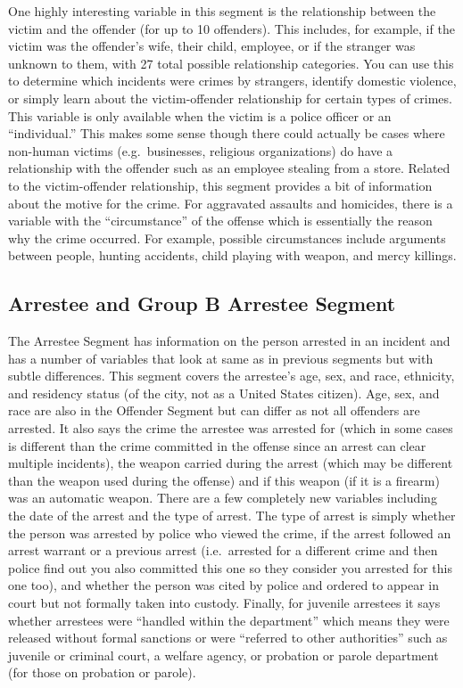 \documentclass[
  12pt,
  openany]{book}
\begin{document}
One highly interesting variable in this segment is the relationship between the victim and the offender (for up to 10 offenders). This includes, for example, if the victim was the offender's wife, their child, employee, or if the stranger was unknown to them, with 27 total possible relationship categories. You can use this to determine which incidents were crimes by strangers, identify domestic violence, or simply learn about the victim-offender relationship for certain types of crimes. This variable is only available when the victim is a police officer or an ``individual.'' This makes some sense though there could actually be cases where non-human victims (e.g.~businesses, religious organizations) do have a relationship with the offender such as an employee stealing from a store. Related to the victim-offender relationship, this segment provides a bit of information about the motive for the crime. For aggravated assaults and homicides, there is a variable with the ``circumstance'' of the offense which is essentially the reason why the crime occurred. For example, possible circumstances include arguments between people, hunting accidents, child playing with weapon, and mercy killings.

\subsection{Arrestee and Group B Arrestee Segment}\label{arrestee-and-group-b-arrestee-segment}

The Arrestee Segment has information on the person arrested in an incident and has a number of variables that look at same as in previous segments but with subtle differences. This segment covers the arrestee's age, sex, and race, ethnicity, and residency status (of the city, not as a United States citizen). Age, sex, and race are also in the Offender Segment but can differ as not all offenders are arrested. It also says the crime the arrestee was arrested for (which in some cases is different than the crime committed in the offense since an arrest can clear multiple incidents), the weapon carried during the arrest (which may be different than the weapon used during the offense) and if this weapon (if it is a firearm) was an automatic weapon. There are a few completely new variables including the date of the arrest and the type of arrest. The type of arrest is simply whether the person was arrested by police who viewed the crime, if the arrest followed an arrest warrant or a previous arrest (i.e.~arrested for a different crime and then police find out you also committed this one so they consider you arrested for this one too), and whether the person was cited by police and ordered to appear in court but not formally taken into custody. Finally, for juvenile arrestees it says whether arrestees were ``handled within the department'' which means they were released without formal sanctions or were ``referred to other authorities'' such as juvenile or criminal court, a welfare agency, or probation or parole department (for those on probation or parole).
\end{document}
